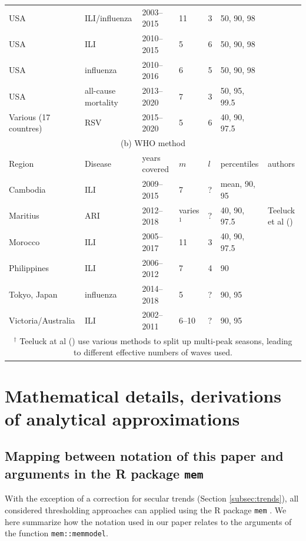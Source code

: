 \documentclass[12pt]{article}
\begin{document}
\begin{table}[h!]
\begin{tabular}{l l l l l l l}
USA & ILI/influenza & 2003--2015 & 11 & 3 & 50, 90, 98 & \cite{Biggerstaff2017}\\
USA & ILI & 2010--2015 & 5 & 6 & 50, 90, 98 & \cite{Dahlgren2018}\\
USA & influenza & 2010--2016 & 6 & 5 & 50, 90, 98 & \cite{Dahlgren2019}\\
USA & all-cause mortality & 2013--2020 & 7 & 3 & 50, 95, 99.5 & \cite{Dahlgren2022}\\
Various (17 countres) & RSV & 2015--2020 & 5 & 6 & 40, 90, 97.5 & \cite{Wang2023} \\ %
\midrule 
\multicolumn{7}{c}{(b) WHO method}\\
\toprule
Region & Disease & years covered & $m$ & $l$ & percentiles & authors\\
\midrule
Cambodia & ILI & 2009--2015 & 7 & ? & mean, 90, 95 & \cite{Ly2017}\\
Maritius & ARI & 2012--2018 & varies$^1$ & ? & 40, 90, 97.5 & Teeluck et al (\citeyear{Teeluck2021}) \\
Morocco & ILI & 2005--2017 & 11 & 3 & 40, 90, 97.5 & \cite{Rguig2020}\\
Philippines & ILI & 2006--2012 & 7 & 4 & 90 & \cite{Lucero2016}\\
Tokyo, Japan & influenza & 2014--2018 & 5 & ? & 90, 95 & \cite{Matsuda2022} \\
Victoria/Australia & ILI & 2002--2011 & 6--10 & ? & 90, 95 & \cite{Tay2013}\\
\bottomrule
\multicolumn{7}{c}{$^\dagger$ Teeluck at al (\citeyear{Teeluck2021}) use various methods to split up multi-peak seasons, leading to different effective numbers of waves used.}\\ 
\end{tabular}
\end{table}

\newpage


\section{Mathematical details, derivations of analytical approximations}
\label{appendix:derivations}

\subsection{Mapping  between notation of this paper and arguments in the R package \texttt{mem}}
\label{suppl:mapping}

With the exception of a correction for secular trends (Section \ref{subsec:trends}), all considered thresholding approaches can applied using the R package \texttt{mem} \citep{Lozano2020}. We here summarize how the notation used in our paper relates to the arguments of the function \texttt{mem::memmodel}.
\end{document}
